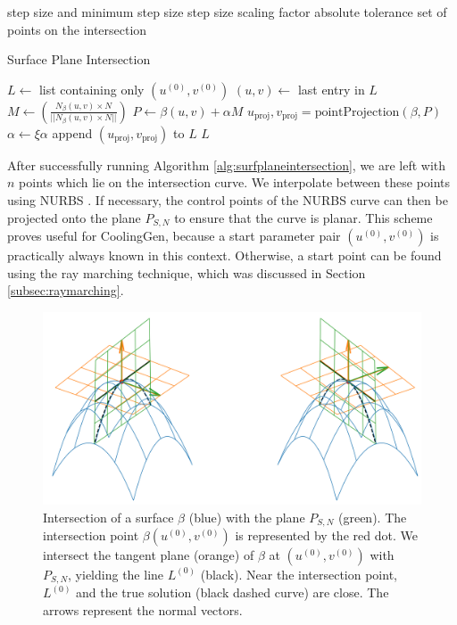 \documentclass[a4paper, 11pt]{report}
\theoremstyle{definition}
\newcommand{\Desc}[2]{\State \makebox[12em][l]{#1}#2}
\begin{document}
	\begin{algorithm}[H]
	\begin{algorithmic}[1]
		\Input
			\Desc{$\alpha > \alpha_0$}{\phantom{aa} step size and minimum step size}
			\Desc{$\xi < 1$}{\phantom{aa} step size scaling factor}
			\Desc{$\epsilon$}{\phantom{aa} absolute tolerance}
		\EndInput
		\Output
			\Desc{$\{(u^{(i)}, v^{(i)}) : i \in \{1, 2, \ldots, n\}\}$ }{\phantom{aa} set of points on the intersection}
		\EndOutput

		\caption{Surface Plane Intersection}\label{alg:surfplaneintersection}
			\State $L \gets$ list containing only $(u^{(0)}, v^{(0)})$
				\State $(u,v) \gets$ last entry in $L$
				\State $M \gets \left(\frac{N_{\beta}(u, v) \times N}{||N_{\beta}(u, v) \times N||}\right)$
				\State $P \gets \beta(u,v) + \alpha M$
				\State $u_\textrm{proj}, v_\textrm{proj} = \textrm{pointProjection}(\beta, P)$
					$\alpha \gets \xi\alpha$
				\Else {} append $(u_\textrm{proj}, v_\textrm{proj})$ to $L$
				\EndIf
			\EndWhile
			\State \Return $L$
		\EndProcedure
	\end{algorithmic}
	\end{algorithm}

	After successfully running Algorithm \ref{alg:surfplaneintersection}, we are left with $n$ points which lie on the intersection curve. We interpolate between these points using NURBS \cite{Piegl1997}. If necessary, the control points of the NURBS curve can then be projected onto the plane $P_{S,N}$ to ensure that the curve is planar. This scheme proves useful for CoolingGen, because a start parameter pair $(u^{(0)}, v^{(0)})$ is practically always known in this context. Otherwise, a start point can be found using the ray marching technique, which was discussed in Section \ref{subsec:raymarching}.

	\begin{figure}[H]
		\centering
		\includegraphics[width=.8\textwidth]{../python/surfacePlaneIntersection2_cropped.png}
		\caption{Intersection of a surface $\beta$ (blue) with the plane $P_{S,N}$ (green). The intersection point $\beta(u^{(0)}, v^{(0)})$ is represented by the red dot. We intersect the tangent plane (orange) of $\beta$ at $(u^{(0)}, v^{(0)})$ with $P_{S,N}$, yielding the line $L^{(0)}$ (black). Near the intersection point, $L^{(0)}$ and the true solution (black dashed curve) are close. The arrows represent the normal vectors.}
		\label{fig:planeintersectionline}
	\end{figure}
\end{document}
